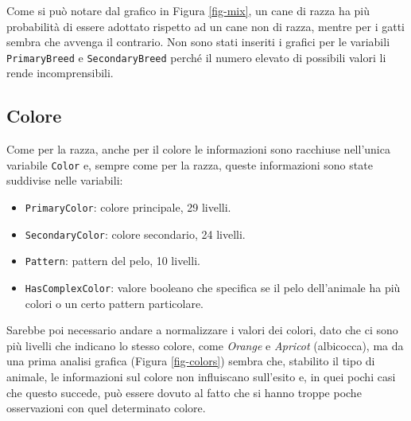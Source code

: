 Come si può notare dal grafico in Figura \ref{fig-mix}, un cane di razza ha più probabilità di essere adottato rispetto ad un cane non di razza, mentre per i gatti sembra che avvenga il contrario. Non sono stati inseriti i grafici per le variabili \texttt{PrimaryBreed} e \texttt{SecondaryBreed} perché il numero elevato di possibili valori li rende incomprensibili.

\subsection{Colore}

Come per la razza, anche per il colore le informazioni sono racchiuse nell'unica variabile \texttt{Color} e, sempre come per la razza, queste informazioni sono state suddivise nelle variabili:

\begin{itemize}
	\item \texttt{PrimaryColor}: colore principale, 29 livelli.
	\item \texttt{SecondaryColor}: colore secondario, 24 livelli.
	\item \texttt{Pattern}: pattern del pelo, 10 livelli.
	\item \texttt{HasComplexColor}: valore booleano che specifica se il pelo dell'animale ha più colori o un certo pattern particolare.
\end{itemize}

Sarebbe poi necessario andare a normalizzare i valori dei colori, dato che ci sono più livelli che indicano lo stesso colore, come \textit{Orange} e \textit{Apricot} (albicocca), ma da una prima analisi grafica (Figura \ref{fig-colors}) sembra che, stabilito il tipo di animale, le informazioni sul colore non influiscano sull'esito e, in quei pochi casi che questo succede, può essere dovuto al fatto che si hanno troppe poche osservazioni con quel determinato colore.

